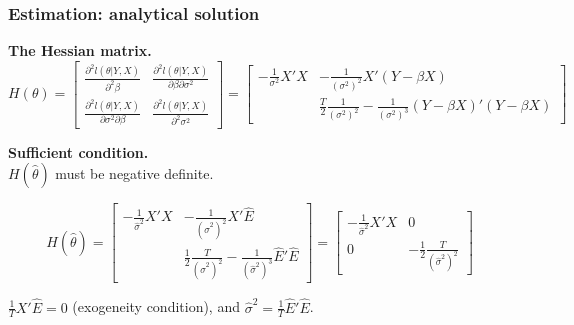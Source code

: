 \documentclass[notes,blackandwhite,mathsans]{beamer}
\begin{document}
\begin{frame}
\frametitle{Estimation: analytical solution}

\normalsize\textbf{The Hessian matrix.}\scriptsize
\begin{equation*}
H(\theta) = \begin{bmatrix} \frac{\partial^2 l\left(\theta|Y,X\right) }{\partial^2\beta} & \frac{\partial^2 l\left(\theta|Y,X\right) }{\partial\beta\partial\sigma^2} \\ \frac{\partial^2 l\left(\theta|Y,X\right) }{\partial\sigma^2\partial\beta} & \frac{\partial^2 l\left(\theta|Y,X\right) }{\partial^2\sigma^2} \end{bmatrix}
=
\begin{bmatrix} 
-\frac{1}{\sigma^2}X'X & -\frac{1}{\left(\sigma^2\right)^2}X'(Y-\beta X)\\
& \frac{T}{2}\frac{1}{\left(\sigma^2\right)^2} - \frac{1}{\left(\sigma^2\right)^3}(Y-\beta X)'(Y-\beta X)
 \end{bmatrix}
\end{equation*}



\bigskip\normalsize\textbf{Sufficient condition.}\\
$H(\hat\theta)$ {\color{mcxs2}must be negative definite}.

\footnotesize\begin{equation*}
H(\hat\theta) = \begin{bmatrix} 
-\frac{1}{\hat\sigma^2}X'X & -\frac{1}{\left(\hat\sigma^2\right)^2}X'\hat{E}\\
& \frac{1}{2}\frac{T}{\left(\hat\sigma^2\right)^2} - \frac{1}{\left(\hat\sigma^2\right)^3}\hat{E}'\hat{E}
 \end{bmatrix}
 = \begin{bmatrix} 
-\frac{1}{\hat\sigma^2}X'X & 0 \\
0 & -\frac{1}{2}\frac{T}{\left(\hat\sigma^2\right)^2} 
 \end{bmatrix}
\end{equation*}

\normalsize{} $\frac{1}{T}X'\hat{E}=0$ {\color{mcxs3}(exogeneity condition), and} $\hat\sigma^2=\frac{1}{T}\hat{E}'\hat{E}$.

\end{frame}
\end{document}
